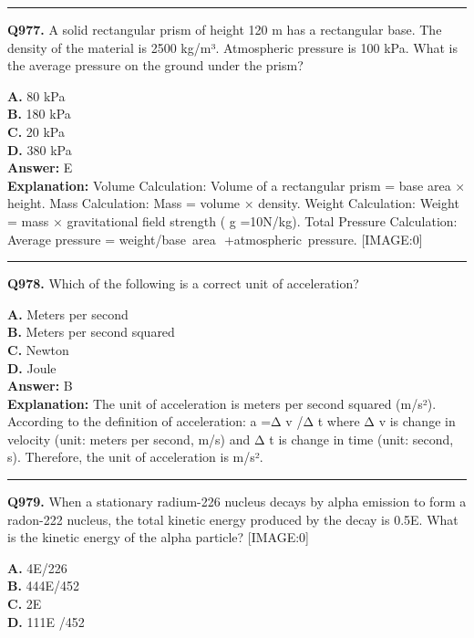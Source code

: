 \documentclass[12pt]{article}
\begin{document}
\hrule
\vspace{1em}


\noindent
\textbf{Q977.} A solid rectangular prism of height 120 m has a rectangular base. The density of the material is 2500 kg/m³. Atmospheric pressure is 100 kPa. What is the average pressure on the ground under the prism?



\textbf{A.} 80 kPa \\
\textbf{B.} 180 kPa \\
\textbf{C.} 20 kPa \\
\textbf{D.} 380 kPa \\

\textbf{Answer:} E \\
\textbf{Explanation:} Volume Calculation: Volume of a rectangular prism = base area × height.
Mass Calculation: Mass = volume × density.
Weight Calculation: Weight = mass × gravitational field strength (
g
=10N/kg).
Total Pressure Calculation: Average pressure = weight/base area
​
+atmospheric pressure.
[IMAGE:0]

\hrule
\vspace{1em}


\noindent
\textbf{Q978.} Which of the following is a correct unit of acceleration?



\textbf{A.} Meters per second \\
\textbf{B.} Meters per second squared \\
\textbf{C.} Newton \\
\textbf{D.} Joule \\

\textbf{Answer:} B \\
\textbf{Explanation:} The unit of acceleration is meters per second squared (m/s²). According to the definition of acceleration:
a
=Δ
v
​/Δ
t
where Δ
v
is change in velocity (unit: meters per second, m/s) and Δ
t
is change in time (unit: second, s). Therefore, the unit of acceleration is m/s².

\hrule
\vspace{1em}


\noindent
\textbf{Q979.} When a stationary radium-226 nucleus decays by alpha emission to form a radon-222 nucleus, the total kinetic energy produced by the decay is 0.5E. What is the kinetic energy of the alpha particle?
[IMAGE:0]



\textbf{A.} 4E​/226 \\
\textbf{B.} 444E​/452 \\
\textbf{C.} 2E \\
\textbf{D.} 111E /452 \\
\end{document}
